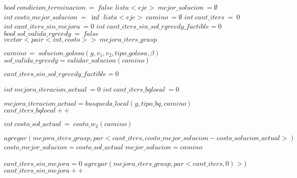 \begin{algorithmic}[1]


	\Statex
	\State $bool \: condicion\_terminacion\: =\: false$
    \State $lista<eje> \:mejor\_solucion\: = \emptyset$
    \State $int \:costo\_mejor\_solucion\: =\: \inf$
    \State $lista<eje> \:camino\: = \emptyset$
    \State $int\: cant\_iters \:= \:0$
    \State $int\: cant\_iters\_sin\_mejora \:= 0$
    \State $int\: cant\_iters\_sin\_sol\_rgreedy\_factible = 0$
    \State $ bool\: sol\_valida\_rgreedy\: =\: false $
    \State $vector<pair<int, costo> > \: mejora\_iters\_grasp$
    \Statex 


    	\State $camino\: =\: solucion\_golosa(g, v_1,v_2, tipo\_golosa, \beta)$
    	\State $ sol\_valida\_rgreedy= validar\_solucion(camino)$

    	\Statex
	
	    			\State $cant\_iters\_sin\_sol\_rgreedy\_factible = 0$
	
	    			\State $int\: mejora\_iteracion\_actual\: = 0$
	        	    \State $int\: cant\_iters\_bqlocal\: = 0$
	
	        	    \Statex
	
	    					\State $mejora\_iteracion\_actual=busqueda\_local(g, tipo\_bq, camino)$
	    					\State $cant\_iters\_bqlocal++$
	
	    			\EndWhile
	
	    			\State $ int \:  costo\_sol\_actual \: = \: costo\_w_2(camino)$
	
	    			\Statex
	
	
							\State $ agregar(mejora\_iters\_grasp, par<cant\_iters, costo\_mejor\_solucion - costo\_solucion\_actual>) $
						\EndIf
	        	    	\State $costo\_mejor\_solucion = costo\_sol\_actual$
	        	    	\State $mejor\_solucion = camino$
	        	    
	        	   	    \State $cant\_iters\_sin\_mejora = 0$
	        		\Else
	        				\State $ agregar(mejora\_iters\_grasp, par<cant\_iters, 0)>) $
	        	        \EndIf
	        	        \State $cant\_iters\_sin\_mejora++$
	        	    

\end{algorithmic}
